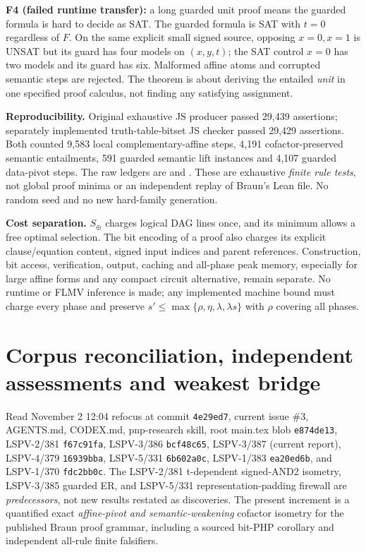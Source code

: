 \documentclass[11pt]{article}
\begin{document}
\noindent\textbf{F4 (failed runtime transfer):} a long guarded unit proof means the guarded formula is hard to decide as SAT. The guarded formula is SAT with $t=0$ regardless of $F$. On the same explicit small signed source, opposing $x=0,x=1$ is UNSAT but its guard has four models on $(x,y,t)$; the SAT control $x=0$ has two models and its guard has six. Malformed affine atoms and corrupted semantic steps are rejected. The theorem is about deriving the entailed \emph{unit} in one specified proof calculus, not finding any satisfying assignment.

\noindent\textbf{Reproducibility.} Original exhaustive JS producer  passed 29,439 assertions; separately implemented truth-table-bitset JS checker  passed 29,429 assertions. Both counted 9,583 local complementary-affine steps, 4,191 cofactor-preserved semantic entailments, 591 guarded semantic lift instances and 4,107 guarded data-pivot steps. The raw ledgers are  and . These are exhaustive \emph{finite rule tests}, not global proof minima or an independent replay of Braun's Lean file. No random seed and no new hard-family generation.

\noindent\textbf{Cost separation.} $S_\oplus$ charges logical DAG lines once, and its minimum allows a free optimal selection. The bit encoding of a proof also charges its explicit clause/equation content, signed input indices and parent references. Construction, bit access, verification, output, caching and all-phase peak memory, especially for large affine forms and any compact circuit alternative, remain separate. No runtime or FLMV inference is made; any implemented machine bound must charge every phase and preserve $s'\le\max\{\rho,\eta,\lambda,\lambda s\}$ with $\rho$ covering all phases.

\section*{Corpus reconciliation, independent assessments and weakest bridge}
Read November 2 12:04 refocus at commit \texttt{4e29ed7}, current issue \#3, AGENTS.md, CODEX.md, pnp-research skill, root main.tex blob \texttt{e874de13}, LSPV-2/381 \texttt{f67c91fa}, LSPV-3/386 \texttt{bcf48c65}, LSPV-3/387 (current report), LSPV-4/379 \texttt{16939bba}, LSPV-5/331 \texttt{6b602a0c}, LSPV-1/383 \texttt{ea20ed6b}, and LSPV-1/370 \texttt{fdc2bb0c}. The LSPV-2/381 t-dependent signed-AND2 isometry, LSPV-3/385 guarded ER, and LSPV-5/331 representation-padding firewall are \emph{predecessors}, not new results restated as discoveries. The present increment is a quantified exact \emph{affine-pivot and semantic-weakening} cofactor isometry for the published Braun proof grammar, including a sourced bit-PHP corollary and independent all-rule finite falsifiers.
\end{document}
